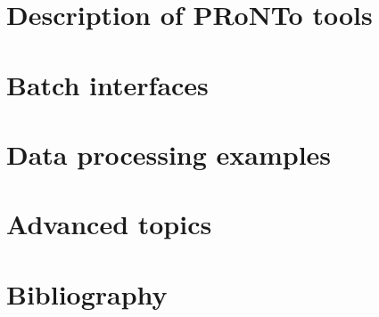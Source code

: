 \documentclass[a4paper,titlepage]{book}
\begin{document}

\dominitoc 
\tableofcontents
\newpage



\part{Description of PRoNTo tools}
\label{sec:GUI}







\part{Batch interfaces}
\label{sec:BATCH}






\part{Data processing examples}




\part{Advanced topics}
\label{sec:ADVTOP}





\part{Bibliography}

\end{document}
